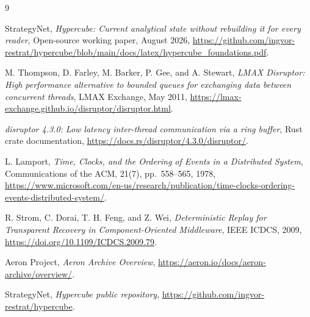 \documentclass{strategynet-journal}
\begin{document}
\clearpage
\begin{thebibliography}{9}

StrategyNet,
\emph{Hypercube: Current analytical state without rebuilding it
for every reader},
Open-source working paper, August 2026,
\url{https://github.com/ingvor-restrat/hypercube/blob/main/docs/latex/hypercube_foundations.pdf}.

M. Thompson, D. Farley, M. Barker, P. Gee, and A. Stewart,
\emph{LMAX Disruptor: High performance alternative to bounded queues for
exchanging data between concurrent threads},
LMAX Exchange, May 2011,
\url{https://lmax-exchange.github.io/disruptor/disruptor.html}.

\emph{disruptor 4.3.0: Low latency inter-thread communication via a ring
buffer},
Rust crate documentation,
\url{https://docs.rs/disruptor/4.3.0/disruptor/}.

L. Lamport,
\emph{Time, Clocks, and the Ordering of Events in a Distributed System},
Communications of the ACM, 21(7), pp.~558--565, 1978,
\url{https://www.microsoft.com/en-us/research/publication/time-clocks-ordering-events-distributed-system/}.

R. Strom, C. Dorai, T. H. Feng, and Z. Wei,
\emph{Deterministic Replay for Transparent Recovery in Component-Oriented
Middleware},
IEEE ICDCS, 2009,
\url{https://doi.org/10.1109/ICDCS.2009.79}.

Aeron Project,
\emph{Aeron Archive Overview},
\url{https://aeron.io/docs/aeron-archive/overview/}.

StrategyNet,
\emph{Hypercube public repository},
\url{https://github.com/ingvor-restrat/hypercube}.

\end{thebibliography}
\end{document}
